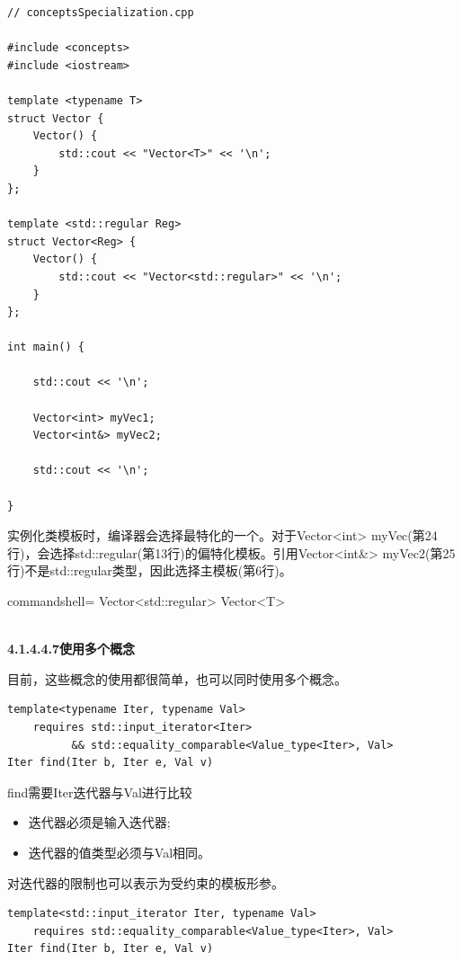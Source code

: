 \begin{lstlisting}[style=styleCXX]
// conceptsSpecialization.cpp

#include <concepts>
#include <iostream>

template <typename T>
struct Vector {
	Vector() {
		std::cout << "Vector<T>" << '\n';
	}
};

template <std::regular Reg>
struct Vector<Reg> {
	Vector() {
		std::cout << "Vector<std::regular>" << '\n';
	}
};

int main() {

	std::cout << '\n';

	Vector<int> myVec1;
	Vector<int&> myVec2;

	std::cout << '\n';

}
\end{lstlisting}

实例化类模板时，编译器会选择最特化的一个。对于Vector<int> myVec(第24行)，会选择std::regular(第13行)的偏特化模板。引用Vector<int\&> myVec2(第25行)不是std::regular类型，因此选择主模板(第6行)。

\begin{tcblisting}{commandshell={}}
Vector<std::regular>
Vector<T>
\end{tcblisting}

\hspace*{\fill} \\ %
\noindent
\textbf{4.1.4.4.7\hspace{0.2cm}使用多个概念}

目前，这些概念的使用都很简单，也可以同时使用多个概念。

\begin{lstlisting}[style=styleCXX]
template<typename Iter, typename Val>
	requires std::input_iterator<Iter>
		  && std::equality_comparable<Value_type<Iter>, Val>
Iter find(Iter b, Iter e, Val v)
\end{lstlisting}

find需要Iter迭代器与Val进行比较

\begin{itemize}
\item
迭代器必须是输入迭代器;

\item
迭代器的值类型必须与Val相同。
\end{itemize}

对迭代器的限制也可以表示为受约束的模板形参。

\begin{lstlisting}[style=styleCXX]
template<std::input_iterator Iter, typename Val>
	requires std::equality_comparable<Value_type<Iter>, Val>
Iter find(Iter b, Iter e, Val v)
\end{lstlisting}

